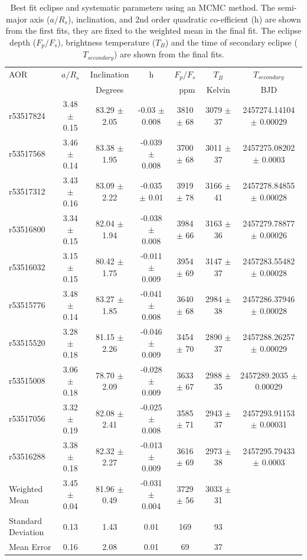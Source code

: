 \begin{landscape}
\begin{table}[]
    \centering
    \caption{Best fit eclipse and systematic parameters using an MCMC method. The semi-major axis ($a/R_s$), inclination, and 2nd order quadratic co-efficient (h) are shown from the first fits, they are fixed to the weighted mean in the final fit. The eclipse depth ($F_p/F_s$), brightness temperature ($T_B$) and the time of secondary eclipse ($T_{secondary}$) are shown from the final fits.}
    \label{P3:tab:resutls}
\begin{tabular}{lccc|ccc}
\hline \hline
 AOR & $a/R_s$ & Inclination & h & $F_p/F_s$ & $T_B$ & $T_{secondary}$ \\
 &  & Degrees & &~ppm & Kelvin & BJD \\
\hline
r53517824 & 3.48 $\pm$ 0.15 &  83.29 $\pm$ 2.05 &   -0.03 $\pm$ 0.008 &  3810 $\pm$ 68 &  3079 $\pm$ 37 &  2457274.14104 $\pm$ 0.00029 \\
r53517568 & 3.46 $\pm$ 0.14 &  83.38 $\pm$ 1.95 &  -0.039 $\pm$ 0.008 &  3700 $\pm$ 68 &  3011 $\pm$ 37 &   2457275.08202 $\pm$ 0.0003 \\
r53517312 & 3.43 $\pm$ 0.16 &  83.09 $\pm$ 2.22 &   -0.035 $\pm$ 0.01 &  3919 $\pm$ 78 &  3166 $\pm$ 41 &  2457278.84855 $\pm$ 0.00028 \\
r53516800 & 3.34 $\pm$ 0.15 &  82.04 $\pm$ 1.94 &  -0.038 $\pm$ 0.008 &  3984 $\pm$ 66 &  3163 $\pm$ 36 &  2457279.78877 $\pm$ 0.00026 \\
r53516032 & 3.15 $\pm$ 0.15 &  80.42 $\pm$ 1.75 &  -0.011 $\pm$ 0.009 &  3954 $\pm$ 69 &  3147 $\pm$ 37 &  2457283.55482 $\pm$ 0.00028 \\
r53515776 & 3.48 $\pm$ 0.14 &  83.27 $\pm$ 1.85 &  -0.041 $\pm$ 0.008 &  3640 $\pm$ 68 &  2984 $\pm$ 38 &  2457286.37946 $\pm$ 0.00028 \\
r53515520 & 3.28 $\pm$ 0.18 &  81.15 $\pm$ 2.26 &  -0.046 $\pm$ 0.009 &  3454 $\pm$ 70 &  2890 $\pm$ 37 &  2457288.26257 $\pm$ 0.00029 \\
r53515008 & 3.06 $\pm$ 0.18 &   78.70 $\pm$ 2.09 &  -0.028 $\pm$ 0.009 &  3633 $\pm$ 67 &  2988 $\pm$ 35 &   2457289.2035 $\pm$ 0.00029 \\
r53517056 & 3.32 $\pm$ 0.19 &  82.08 $\pm$ 2.41 &  -0.025 $\pm$ 0.008 &  3585 $\pm$ 71 &  2943 $\pm$ 37 &  2457293.91153 $\pm$ 0.00031 \\
r53516288 & 3.38 $\pm$ 0.18 &  82.32 $\pm$ 2.27 &  -0.013 $\pm$ 0.009 &  3616 $\pm$ 69 &  2973 $\pm$ 38 &   2457295.79433 $\pm$ 0.0003 \\
\hline
Weighted Mean & 3.45 $\pm$ 0.04 & 81.96 $\pm$ 0.49 & -0.031 $\pm$ 0.004 & 3729 $\pm$ 56 & 3033 $\pm$ 31 & \\
\hline
Standard Deviation & 0.13 & 1.43 & 0.01 & 169 & 93 & \\
Mean Error & 0.16 & 2.08 & 0.01 & 69 & 37 & \\
\hline
\end{tabular}

\end{table}
\end{landscape}

